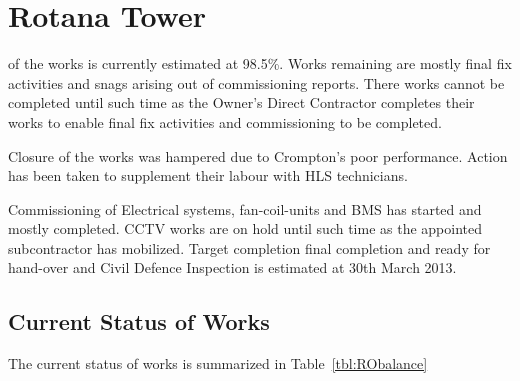 \chapter{Rotana Tower}

 of the works is currently estimated at 98.5\%. Works remaining are mostly final fix activities and snags arising out of commissioning reports. There works cannot be completed until such time as the Owner's Direct Contractor completes their works to enable final fix activities and commissioning to be completed. 

Closure of the works was hampered due to  Crompton's poor performance. Action has been taken to supplement their labour with HLS technicians.

Commissioning of Electrical systems, fan-coil-units and BMS has started and mostly completed.  CCTV works are on hold until such time as the appointed subcontractor has mobilized. Target completion final completion and ready for hand-over and Civil Defence Inspection is estimated at 30th March 2013. 


\section{Current Status of Works}

The current status of works is summarized in Table~\ref{tbl:RObalance}

\bigskip

